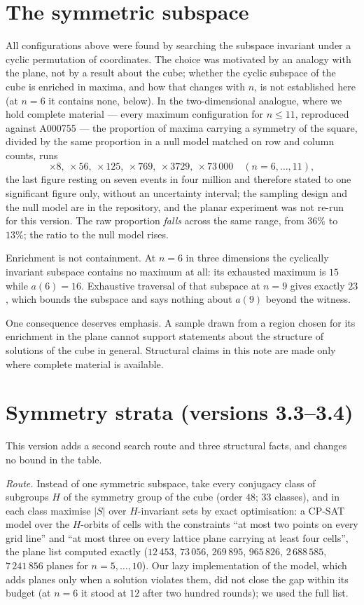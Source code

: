 \documentclass[11pt,a4paper]{article}
\begin{document}
\section{The symmetric subspace}\label{s:subspace}
All configurations above were found by searching the subspace invariant under a cyclic
permutation of coordinates.  The choice was motivated by an analogy with the plane, not by a
result about the cube; whether the cyclic subspace of the cube is enriched in maxima, and how that
changes with $n$, is not established here (at $n=6$ it contains none, below).  In the two-dimensional
analogue, where we hold complete material --- every maximum
configuration for $n\le11$, reproduced against A000755 --- the proportion of maxima carrying a
symmetry of the square, divided by the same proportion in a null model matched on row and column
counts, runs
\[\times8,\ \times56,\ \times125,\ \times769,\ \times3729,\ \times73\,000\quad (n=6,\dots,11),\]
the last figure resting on seven events in four million and therefore stated to one significant
figure only, without an uncertainty interval; the sampling design and the null model are in the
repository, and the planar experiment was not re-run for this version.  The raw proportion \emph{falls} across the same range, from $36\%$ to $13\%$; the
ratio to the null model rises.

Enrichment is not containment.  At $n=6$ in three dimensions the cyclically invariant subspace
contains no maximum at all: its exhausted maximum is $15$ while $a(6)=16$.  Exhaustive traversal
of that subspace at $n=9$ gives exactly $23$, which bounds the subspace and says nothing about
$a(9)$ beyond the witness.

One consequence deserves emphasis.  A sample drawn from a region chosen for its enrichment in the
plane cannot support statements about the structure of solutions of the cube in general.  Structural
claims in this note are made only where complete material is available.

\section{Symmetry strata (versions 3.3--3.4)}\label{s:strata}
This version adds a second search route and three structural facts, and changes no bound in the
table.

\emph{Route.}  Instead of one symmetric subspace, take every conjugacy class of subgroups $H$
of the symmetry group of the cube (order $48$; $33$ classes), and in each class maximise $|S|$
over $H$-invariant sets by exact optimisation: a CP-SAT model over the $H$-orbits of cells with the
constraints ``at most two points on every grid line'' and ``at most three on every lattice plane
carrying at least four cells'', the plane list computed exactly ($12\,453$, $73\,056$, $269\,895$,
$965\,826$, $2\,688\,585$, $7\,241\,856$ planes for $n=5,\dots,10$).  Our lazy implementation of the model,
which adds planes only when a solution violates them, did not close the gap within its budget (at
$n=6$ it stood at $12$ after two hundred rounds); we used the full list.
\end{document}
